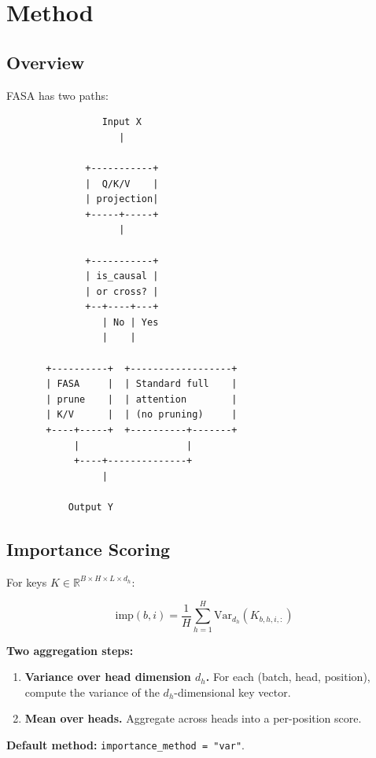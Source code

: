 
\section{Method}

\subsection{Overview}

FASA has two paths:

\begin{lstlisting}
                 Input X
                    |
                     
              +-----------+
              |  Q/K/V    |
              | projection|
              +-----+-----+
                    |
                     
              +-----------+
              | is_causal |
              | or cross? |
              +--+----+---+
                 | No | Yes
                 |    |
                       
       +----------+  +------------------+
       | FASA     |  | Standard full    |
       | prune    |  | attention        |
       | K/V      |  | (no pruning)     |
       +----+-----+  +----------+-------+
            |                   |
            +----+--------------+
                 |
                  
           Output Y
\end{lstlisting}

\subsection{Importance Scoring}

For keys $K \in \mathbb{R}^{B \times H \times L \times d_h}$:

\[
\text{imp}(b, i) = \frac{1}{H} \sum_{h=1}^{H} \text{Var}_{d_h}(K_{b,h,i,:})
\tag{4.1}
\]

\textbf{Two aggregation steps:}
\begin{enumerate}
\item \textbf{Variance over head dimension $d_h$.} For each (batch, head, position),
  compute the variance of the $d_h$-dimensional key vector.
\item \textbf{Mean over heads.} Aggregate across heads into a per-position score.

\end{enumerate}
\textbf{Default method:} \texttt{importance\_method = "var"}.

